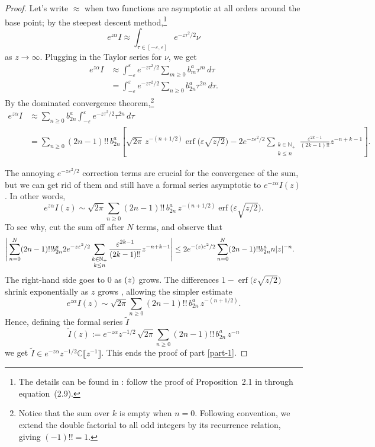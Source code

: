 \documentclass{article}
\let\Re\relax
\DeclareMathOperator{\Re}{Re}
\newcommand{\C}{\mathbb{C}}
\theoremstyle{definition}
\theoremstyle{plain}
\begin{document}
{\begin{proof}
Let's write $\approx$ when two functions are asymptotic at all orders around the base point; by the steepest descent method,\footnote{The details can be found in \cite{miller2006applied}: follow the proof of Proposition~2.1 in through equation~(2.9).}
\[ e^{z \alpha} I \approx \int_{\tau \in [-\varepsilon, \varepsilon]} e^{-z\tau^2/2} \nu \]
as $z \to \infty$. Plugging in the Taylor series for $\nu$, we get
\begin{align*}
e^{z \alpha} I & \approx \int_{-\varepsilon}^\varepsilon e^{-z\tau^2/2} \sum_{m \ge 0} b_m^a \tau^m\,d\tau \\
& = \int_{-\varepsilon}^\varepsilon e^{-z\tau^2/2} \sum_{n \ge 0} b_{2n}^a \tau^{2n}\,d\tau.
\end{align*}
By the dominated convergence theorem,\footnote{Notice that the sum over $k$ is empty when $n = 0$. Following convention, we extend the double factorial to all odd integers by its recurrence relation, giving $(-1)!! = 1$.}
\begin{align*}
e^{z \alpha} I & \approx \sum_{n \ge 0} b_{2n}^a \int_{-\varepsilon}^\varepsilon e^{-z\tau^2/2} \tau^{2n}\,d\tau \\
& = \sum_{n \ge 0} (2n-1)!!\,b_{2n}^a \left[ \sqrt{2\pi}\,z^{-(n+1/2)} \operatorname{erf}\big(\varepsilon \sqrt{z/2}\big) - 2e^{-z\varepsilon^2/2} \sum_{\substack{k \in \mathbb{N}_+ \\ k \le n}} \frac{\varepsilon^{2k-1}}{(2k-1)!!} z^{-n+k-1} \right].
\end{align*}

The annoying $e^{-z\varepsilon^2/2}$ correction terms are crucial for the convergence of the sum, but we can get rid of them and still have a formal series asymptotic to $e^{-z \alpha} I(z)$. In other words,
\[ e^{z \alpha} I(z) \sim \sqrt{2\pi} \sum_{n \ge 0} (2n-1)!!\,b_{2n}^a\,z^{-(n+1/2)} \operatorname{erf}\big(\varepsilon \sqrt{z/2}\big). \]
To see why, cut the sum off after $N$ terms, and observe that
\begin{align*}
  \Bigg | \sum_{n= 0}^N(2n-1)!! b_{2n}^a  2e^{-z\varepsilon^2/2} \sum_{\substack{k \in \mathbb{N}_+ \\ k \le n}} \frac{\varepsilon^{2k-1}}{(2k-1)!!} z^{-n+k-1} \Bigg | &\leq  2 e^{-\Re (z) \varepsilon^2/2} \sum_{n=0}^N(2n-1)!! b_{2n}^a n|z|^{-n}.
\end{align*}
The right-hand side goes to $0$ as $\Re(z)$ grows.
The differences $1 - \operatorname{erf}\big(\varepsilon \sqrt{z/2}\big)$ shrink exponentially as $z$ grows \cite[inequality~(5)]{chiani-dardari-book}, allowing the simpler estimate
\[ e^{z\alpha} I(z) \sim \sqrt{2\pi} \sum_{n \ge 0} (2n-1)!!\, b_{2n}^a \,z^{-(n+1/2)}. \]
Hence, defining the formal series $\tilde{I}$
\[\tilde{I}(z):=e^{-z\alpha} z^{-1/2}\, \sqrt{2\pi} \sum_{n \ge 0} (2n-1)!!\, b_{2n}^a \,z^{-n}\]
we get $\tilde{I}\in e^{-z\alpha}z^{-1/2}\C\llbracket z^{-1}\rrbracket$. This ends the proof of part \ref{part-1}.


\end{proof}}
\end{document}
